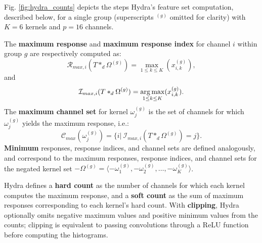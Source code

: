 Fig. \ref{fig:hydra_counts} depicts the steps Hydra's feature set computation, described below, for a single group (superscripts $^{(g)}$ omitted for clarity) with $K = 6$ kernels and $p = 16$ channels.  

The \textbf{maximum response} and \textbf{maximum response index} for channel $i$ within group $g$ are respectively computed as:
\begin{equation}
    \mathcal{R}_{max,i}(T *_d \Omega^{(g)}) = \max\limits_{1 \leq k \leq K}(x_{i,k}^{(g)}),
    \label{eq:Rmax}
\end{equation}
and
\begin{equation}
    \mathcal{I}_{max,i}(T *_d \Omega^{(g)}) = \operatorname*{arg\,max}\limits_{1 \leq k \leq K}(x_{i,k}^{(g)}). 
    \label{eq:Imax}
\end{equation}
The \textbf{maximum channel set} for kernel $\omega_j^{(g)}$ is the set of channels for which $\omega_j^{(g)}$ yields the maximum response, i.e.: 
\begin{equation}
    \mathcal{C}_{max}(\omega_j^{(g)}) = \{i|\ \mathcal{I}_{max,i}(T *_d \Omega^{(g)}) = j\}. 
    \label{eq:Cmax}
\end{equation}
\textbf{Minimum} responses, response indices, and channel sets are defined analogously, and correspond to the maximum responses, response indices, and channel sets for the negated kernel set $-\Omega^{(g)} = \langle -\omega_1^{(g)}, -\omega_2^{(g)}, \ldots, -\omega_K^{(g)} \rangle$. 

Hydra defines a \textbf{hard count} as the number of channels for which each kernel computes the maximum response, and a \textbf{soft count} as the sum of maximum responses corresponding to each kernel's hard count. With \textbf{clipping}, Hydra optionally omits negative maximum values and positive minimum values from the counts; clipping is equivalent to passing convolutions through a ReLU function before computing the histograms. 


